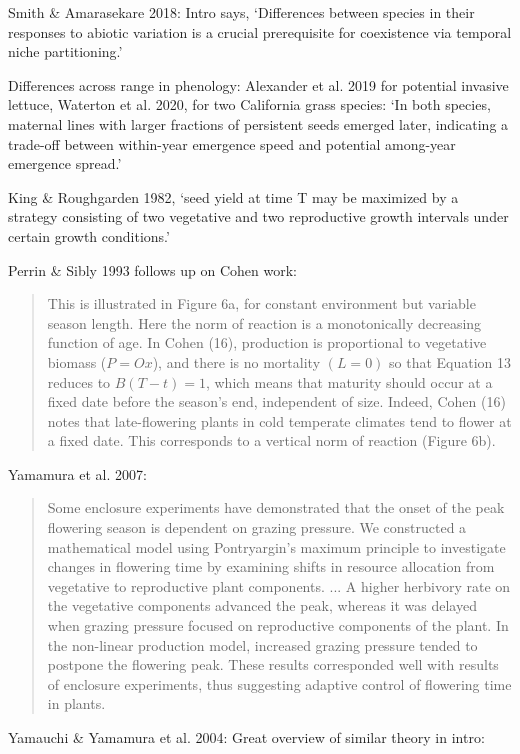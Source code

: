 \documentclass[11pt]{article}
\begin{document}
Smith \& Amarasekare 2018: Intro says, `Differences between species in their responses to abiotic variation is a crucial prerequisite for coexistence via temporal niche partitioning.' 

Differences across range in phenology: Alexander et al. 2019 for potential invasive lettuce, Waterton et al. 2020, for two California grass species: `In both species, maternal lines with larger fractions of persistent seeds emerged later, indicating a trade-off between within-year emergence speed and potential among-year emergence spread.'

King \& Roughgarden 1982, `seed yield at time T may be maximized by a strategy consisting of two vegetative and two reproductive growth intervals under certain growth conditions.'

Perrin \& Sibly 1993 follows up on Cohen work:
\begin{quote}
This is illustrated in Figure 6a, for constant environment but variable season length. Here the norm of reaction is a monotonically decreasing function of age. In Cohen (16), production is proportional to vegetative biomass ($P = Ox$), and there is no mortality $(L = 0)$ so that Equation 13 reduces to $B(T - t) = 1$, which means that maturity
should occur at a fixed date before the season's end, independent of size. Indeed, Cohen (16) notes that late-flowering plants in cold temperate climates tend to flower at a fixed date. This corresponds to a vertical norm of reaction (Figure 6b).
\end{quote}

Yamamura et al. 2007: 

\begin{quote}
Some enclosure experiments have demonstrated that the onset of the peak flowering season is dependent on grazing pressure. We constructed a mathematical model using Pontryargin’s maximum principle to investigate changes in flowering time by examining shifts in resource allocation from vegetative to reproductive plant components. ... A higher herbivory rate on the vegetative components advanced the peak, whereas it was delayed when grazing pressure focused on reproductive components of the plant. In the non-linear production model, increased grazing pressure tended to postpone the flowering peak. These results corresponded well with results of enclosure experiments, thus suggesting adaptive control of flowering time in plants.
\end{quote}


Yamauchi \& Yamamura et al. 2004: Great overview of similar theory in intro:
\end{document}
